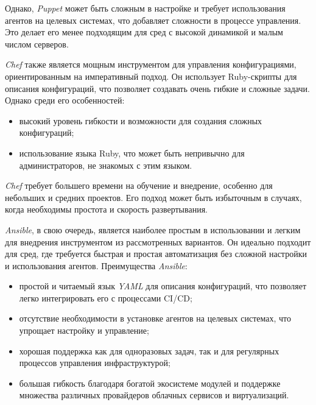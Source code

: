 Однако, \textit{Puppet} может быть сложным в настройке и требует использования агентов на целевых системах, что добавляет сложности в процессе управления. Это делает его менее подходящим для сред с высокой динамикой и малым числом серверов.


\textit{Chef} также является мощным инструментом для управления конфигурациями, ориентированным на императивный подход. Он использует Ruby-скрипты для описания конфигураций, что позволяет создавать очень гибкие и сложные задачи. Однако среди его особенностей:
\begin{itemize}
    \item высокий уровень гибкости и возможности для создания сложных конфигураций;
    \item использование языка Ruby, что может быть непривычно для администраторов, не знакомых с этим языком.
\end{itemize}

\textit{Chef} требует большего времени на обучение и внедрение, особенно для небольших и средних проектов. Его подход может быть избыточным в случаях, когда необходимы простота и скорость развертывания.


\textit{Ansible}, в свою очередь, является наиболее простым в использовании и легким для внедрения инструментом из рассмотренных вариантов. Он идеально подходит для сред, где требуется быстрая и простая автоматизация без сложной настройки и использования агентов. Преимущества \textit{Ansible}:
\begin{itemize}
    \item простой и читаемый язык \textit{YAML} для описания конфигураций, что позволяет легко интегрировать его с процессами CI/CD;
    \item отсутствие необходимости в установке агентов на целевых системах, что упрощает настройку и управление;
    \item хорошая поддержка как для одноразовых задач, так и для регулярных процессов управления инфраструктурой;
    \item большая гибкость благодаря богатой экосистеме модулей и поддержке множества различных провайдеров облачных сервисов и виртуализаций.
\end{itemize}

